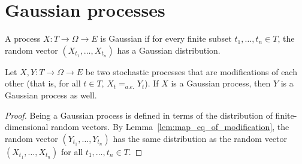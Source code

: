\section{Gaussian processes}
\label{sec:gaussian_processes}

\begin{definition}\label{def:IsGaussianProcess}
  \mathlibok
A process $X : T \to \Omega \to E$ is Gaussian if for every finite subset $t_1, \ldots, t_n \in T$, the random vector $(X_{t_1}, \ldots, X_{t_n})$ has a Gaussian distribution.
\end{definition}


\begin{lemma}\label{lem:isGaussianProcess_of_modification}
  \mathlibok
Let $X, Y : T \to \Omega \to E$ be two stochastic processes that are modifications of each other (that is, for all $t \in T$, $X_t =_{a.e.} Y_t$).
If $X$ is a Gaussian process, then $Y$ is a Gaussian process as well.
\end{lemma}

\begin{proof}  
Being a Gaussian process is defined in terms of the distribution of finite-dimensional random vectors.
By Lemma~\ref{lem:map_eq_of_modification}, the random vector $(Y_{t_1}, \ldots, Y_{t_n})$ has the same distribution as the random vector $(X_{t_1}, \ldots, X_{t_n})$ for all $t_1, \ldots, t_n \in T$.
\end{proof}
